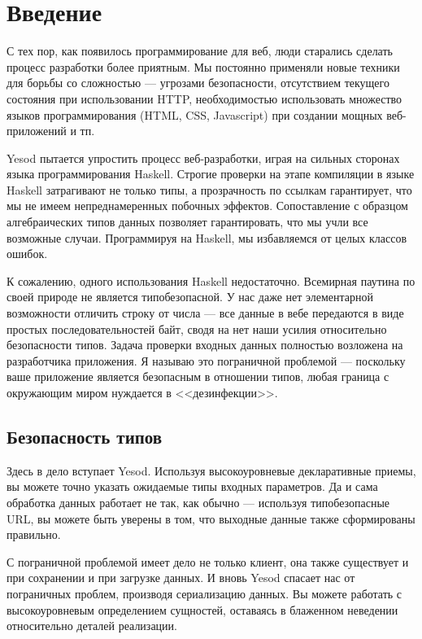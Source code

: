 \chapter{Введение}\label{chap:introduction}

С тех пор, как появилось программирование для веб, люди старались сделать процесс разработки более приятным. Мы постоянно применяли новые техники для борьбы со сложностью --- угрозами безопасности, отсутствием текущего состояния при использовании HTTP, необходимостью использовать множество языков программирования (HTML, CSS, Javascript) при создании мощных веб-приложений и тп.

Yesod пытается упростить процесс веб-разработки, играя на сильных сторонах языка программирования Haskell. Строгие проверки на этапе компиляции в языке Haskell затрагивают не только типы, а прозрачность по ссылкам гарантирует, что мы не имеем непреднамеренных побочных эффектов. Сопоставление с образцом алгебраических типов данных позволяет гарантировать, что мы учли все возможные случаи. Программируя на Haskell, мы избавляемся от целых классов ошибок.

К сожалению, одного использования Haskell недостаточно. Всемирная паутина по своей природе не является типобезопасной. У нас даже нет элементарной возможности отличить строку от числа --- все данные в вебе передаются в виде простых последовательностей байт, сводя на нет наши усилия относительно безопасности типов. Задача проверки входных данных полностью возложена на разработчика приложения. Я называю это пограничной проблемой --- поскольку ваше приложение является безопасным в отношении типов, любая граница с окружающим миром нуждается в <<дезинфекции>>.

\section{Безопасность типов}

Здесь в дело вступает Yesod. Используя высокоуровневые декларативные приемы, вы можете точно указать ожидаемые типы входных параметров. Да и сама обработка данных работает не так, как обычно --- используя типобезопасные URL, вы можете быть уверены в том, что выходные данные также сформированы правильно.

С пограничной проблемой имеет дело не только клиент, она также существует и при сохранении и при загрузке данных. И вновь Yesod спасает нас от пограничных проблем, производя сериализацию данных. Вы можете работать с высокоуровневым определением сущностей, оставаясь в блаженном неведении относительно деталей реализации.

